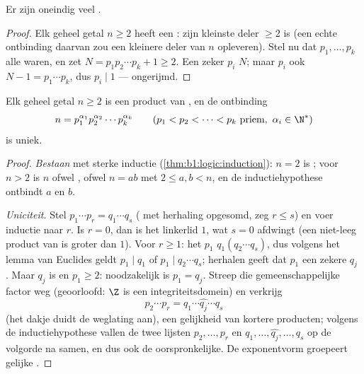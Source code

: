 \begin{theorem}[Euclides]\label{thm:b1:arith:euclidprimes}
Er zijn oneindig veel .
\end{theorem}

\begin{proof}
Elk geheel getal $n \geq 2$ heeft een : zijn kleinste deler
$\geq 2$ is  (een echte ontbinding daarvan zou een kleinere deler
van $n$ opleveren). Stel nu dat $p_1, \dots, p_k$ alle 
waren, en zet $N = p_1 p_2 \cdots p_k + 1 \geq 2$. Een zeker 
$p_i$  $N$; maar $p_i$  ook $N - 1 = p_1\cdots p_k$, dus $p_i
\mid 1$ --- ongerijmd.
\end{proof}

\begin{theorem}\label{thm:b1:arith:fta}
Elk geheel getal $n \geq 2$ is een product van , en de
ontbinding
\[
n = p_1^{\alpha_1} p_2^{\alpha_2} \cdots p_k^{\alpha_k}
\qquad (p_1 < p_2 < \dots < p_k \text{ priem},\ \alpha_i \in \N^*)
\]
is uniek.
\end{theorem}

\begin{proof}
\emph{Bestaan} met sterke inductie (\cref{thm:b1:logic:induction}): $n =
2$ is ; voor $n > 2$ is $n$ ofwel , ofwel $n = ab$ met $2 \leq
a, b < n$, en de inductiehypothese ontbindt $a$ en $b$.

\emph{Uniciteit.} Stel $p_1 \cdots p_r = q_1 \cdots q_s$ (
met herhaling opgesomd, zeg $r \leq s$) en voer inductie naar $r$. Is $r
= 0$, dan is het linkerlid $1$, wat $s = 0$ afdwingt (een niet-leeg
product van  is groter dan $1$). Voor $r \geq 1$: het
 $p_1$  $q_1(q_2\cdots q_s)$, dus volgens het lemma van
Euclides geldt $p_1 \mid q_1$ of $p_1 \mid q_2\cdots q_s$; herhalen geeft
dat $p_1$ een zekere $q_j$ . Maar $q_j$ is  en $p_1 \geq 2$:
noodzakelijk is $p_1 = q_j$. Streep die gemeenschappelijke factor weg
(geoorloofd: $\Z$ is een integriteitsdomein) en verkrijg
\[
p_2 \cdots p_r = q_1 \cdots \widehat{q_j} \cdots q_s
\]
(het dakje duidt de weglating aan), een gelijkheid van kortere producten;
volgens de inductiehypothese vallen de twee lijsten $p_2, \dots, p_r$ en
$q_1, \dots, \widehat{q_j}, \dots, q_s$ op de volgorde na samen, en dus
ook de oorspronkelijke. De exponentvorm groepeert gelijke .
\end{proof}

